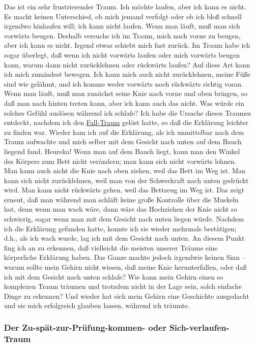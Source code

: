 Das ist ein sehr frustrierender Traum.
Ich möchte laufen, aber ich kann es nicht.
Es macht keinen Unterschied, ob mich jemand verfolgt oder ob ich bloß schnell irgendwo hinlaufen will; ich kann nicht laufen.
Wenn man läuft, muß man sich vorwärts beugen.
Deshalb versuche ich im Traum, mich nach vorne zu beugen, aber ich kann es nicht.
Irgend etwas schiebt mich fast zurück.
Im Traum habe ich sogar überlegt, daß wenn ich nicht vorwärts laufen oder mich vorwärts beugen kann, warum dann nicht zurücklehnen oder rückwärts laufen?
Auf diese Art kann ich mich zumindest bewegen.
Ich kann mich auch nicht zurücklehnen, meine Füße sind wie gelähmt, und ich komme weder vorwärts noch rückwärts richtig voran.
Wenn man läuft, muß man zunächst seine Knie nach vorne und oben bringen, so daß man nach hinten treten kann, aber ich kann auch das nicht.
Was würde ein solches Gefühl auslösen während ich schlafe?
Ich habe die Ursache dieses Traumes entdeckt, nachdem ich den \hyperref[c3_5b]{Fall-Traum} gelöst hatte, so daß die Erklärung leichter zu finden war.
Wieder kam ich auf die Erklärung, als ich unmittelbar nach dem Traum aufwachte und mich selber mit dem Gesicht nach unten auf dem Bauch liegend fand. Heureka!
Wenn man auf dem Bauch liegt, kann man den Winkel des Körpers zum Bett nicht verändern; man kann sich nicht vorwärts lehnen.
Man kann auch nicht die Knie nach oben ziehen, weil das Bett im Weg ist.
Man kann sich nicht zurücklehnen, weil man von der Schwerkraft nach unten gedrückt wird.
Man kann nicht rückwärts gehen, weil das Bettzeug im Weg ist.
Das zeigt erneut, daß man während man schläft keine große Kontrolle über die Muskeln hat, denn wenn man wach wäre, dann wäre das Hochziehen der Knie nicht so schwierig, sogar wenn man mit dem Gesicht nach unten liegen würde.
Nachdem ich die Erklärung gefunden hatte, konnte ich sie wieder mehrmals bestätigen; d.h., als ich wach wurde, lag ich mit dem Gesicht nach unten.
An diesem Punkt fing ich an zu erkennen, daß vielleicht die meisten unserer Träume eine körperliche Erklärung haben.
Das Ganze machte jedoch irgendwie keinen Sinn -- warum sollte mein Gehirn nicht wissen, daß meine Knie herunterfallen, oder daß ich mit dem Gesicht nach unten schlafe?
Wie kann mein Gehirn einen so komplexen Traum träumen und trotzdem nicht in der Lage sein, solch einfache Dinge zu erkennen?
Und wieder hat sich mein Gehirn eine Geschichte ausgedacht und sie mich erfolgreich glauben lassen, während ich träumte.


\subsubsection{Der Zu-spät-zur-Prüfung-kommen- oder Sich-verlaufen-Traum}
\label{c3_5d}

